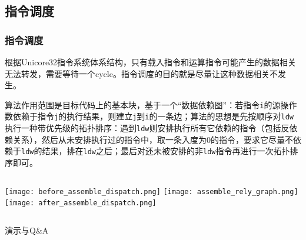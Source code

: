 \documentclass{beamer}
\begin{document}
\subsection{指令调度}
\begin{frame}
	\frametitle{指令调度}
	根据Unicore32指令系统体系结构，只有载入指令和运算指令可能产生的数据相关无法转发，需要等待一个cycle。指令调度的目的就是尽量让这种数据相关不发生。
	
	算法作用范围是目标代码上的基本块，基于一个“数据依赖图”：若指令\lstinline|i|的源操作数依赖于指令\lstinline|j|的执行结果，则建立\lstinline|j|到\lstinline|i|的一条边；算法的思想是先按顺序对\lstinline|ldw|执行一种带优先级的拓扑排序：遇到\lstinline|ldw|则安排执行所有它依赖的指令（包括反依赖关系），然后从未安排执行过的指令中，取一条入度为0的指令，要求它尽量不依赖于\lstinline|ldw|的结果，排在\lstinline|ldw|之后；最后对还未被安排的非\lstinline|ldw|指令再进行一次拓扑排序即可。
\begin{columns}
		\texttt{[image: before\_assemble\_dispatch.png]}
		\texttt{[image: assemble\_rely\_graph.png]}
		\texttt{[image: after\_assemble\_dispatch.png]}
\end{columns}
\end{frame}

\begin{frame}
	\begin{center}
	\Large{演示与Q\&A}
	\end{center}
\end{frame}
\end{document}
